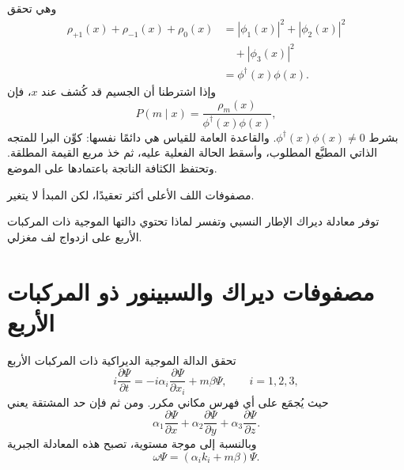 وهي تحقق
\begin{equation}
\begin{aligned}
\rho_{+1}(x)+\rho_{-1}(x)+\rho_0(x)
&=
|\phi_1(x)|^2+|\phi_2(x)|^2
\\
&\quad{}+|\phi_3(x)|^2
\\
&=
\phi^\dagger(x)\phi(x).
\end{aligned}
\end{equation}
وإذا اشترطنا أن الجسيم قد كُشف عند \(x\)، فإن
\begin{equation}
P(m\mid x)
=
\frac{\rho_m(x)}{\phi^\dagger(x)\phi(x)},
\end{equation}
بشرط \(\phi^\dagger(x)\phi(x)\neq0\). والقاعدة العامة للقياس هي دائمًا نفسها: كوِّن البرا للمتجه الذاتي المطبَّع المطلوب، وأسقط الحالة الفعلية عليه، ثم خذ مربع القيمة المطلقة. وتحتفظ الكثافة الناتجة باعتمادها على الموضع.

مصفوفات اللف الأعلى أكثر تعقيدًا، لكن المبدأ لا يتغير.

\begin{classroomqa}
\end{classroomqa}

\begin{classroomqa}
\end{classroomqa}

توفر معادلة ديراك الإطار النسبي وتفسر لماذا تحتوي دالتها الموجية ذات المركبات الأربع على ازدواج لف مغزلي.

\section{مصفوفات ديراك والسبينور ذو المركبات الأربع}

تحقق الدالة الموجية الديراكية ذات المركبات الأربع
\begin{equation}
i\frac{\partial\Psi}{\partial t}
=
-i\alpha_i\frac{\partial\Psi}{\partial x_i}
+m\beta\Psi,
\qquad i=1,2,3,
\end{equation}
حيث يُجمَع على أي فهرس مكاني مكرر. ومن ثم فإن حد المشتقة يعني
\begin{equation}
\alpha_1\frac{\partial\Psi}{\partial x}
+\alpha_2\frac{\partial\Psi}{\partial y}
+\alpha_3\frac{\partial\Psi}{\partial z}.
\end{equation}
وبالنسبة إلى موجة مستوية، تصبح هذه المعادلة الجبرية
\begin{equation}
\omega\Psi=(\alpha_i k_i+m\beta)\Psi.
\end{equation}


